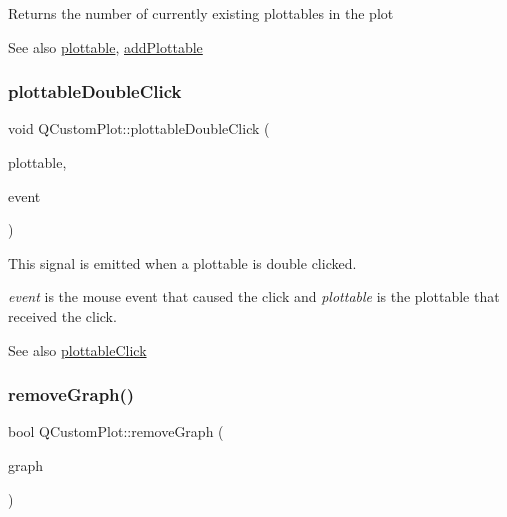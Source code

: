 Returns the number of currently existing plottables in the plot

\begin{DoxySeeAlso}{See also}
\hyperlink{class_q_custom_plot_a32de81ff53e263e785b83b52ecd99d6f}{plottable}, \hyperlink{class_q_custom_plot_ab7ad9174f701f9c6f64e378df77927a6}{add\+Plottable} 
\end{DoxySeeAlso}
\hypertarget{class_q_custom_plot_af2e6f1cea923dae437681d01ce7d0c31}{}\label{class_q_custom_plot_af2e6f1cea923dae437681d01ce7d0c31} 
\subsubsection{\texorpdfstring{plottable\+Double\+Click}{plottableDoubleClick}}
{\footnotesize\ttfamily void Q\+Custom\+Plot\+::plottable\+Double\+Click (\begin{DoxyParamCaption}\item[{\hyperlink{class_q_c_p_abstract_plottable}{Q\+C\+P\+Abstract\+Plottable} $\ast$}]{plottable,  }\item[{Q\+Mouse\+Event $\ast$}]{event }\end{DoxyParamCaption})\hspace{0.3cm}{\ttfamily [signal]}}

This signal is emitted when a plottable is double clicked.

{\itshape event} is the mouse event that caused the click and {\itshape plottable} is the plottable that received the click.

\begin{DoxySeeAlso}{See also}
\hyperlink{class_q_custom_plot_a57e5efa8a854620e9bf62d31fc139f53}{plottable\+Click} 
\end{DoxySeeAlso}
\hypertarget{class_q_custom_plot_a903561be895fb6528a770d66ac5e6713}{}\label{class_q_custom_plot_a903561be895fb6528a770d66ac5e6713} 
\subsubsection{\texorpdfstring{remove\+Graph()}{removeGraph()}\hspace{0.1cm}{\footnotesize\ttfamily [1/2]}}
{\footnotesize\ttfamily bool Q\+Custom\+Plot\+::remove\+Graph (\begin{DoxyParamCaption}\item[{\hyperlink{class_q_c_p_graph}{Q\+C\+P\+Graph} $\ast$}]{graph }\end{DoxyParamCaption})}


